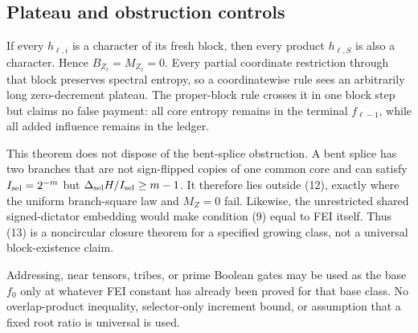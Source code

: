 \subsection*{Plateau and obstruction controls}

If every $h_{\ell,i}$ is a character of its fresh block, then every product
$h_{\ell,S}$ is also a character.  Hence $B_{Z_\ell}=M_{Z_\ell}=0$.
Every partial coordinate restriction through that block preserves spectral
entropy, so a coordinatewise rule sees an arbitrarily long zero-decrement
plateau.  The proper-block rule crosses it in one block step but claims no
false payment: all core entropy remains in the terminal $f_{\ell-1}$, while
all added influence remains in the ledger.

This theorem does not dispose of the bent-splice obstruction.  A bent splice
has two branches that are not sign-flipped copies of one common core and can
satisfy $I_{\rm sel}=2^{-m}$ but
$\Delta_{\rm sel}H/I_{\rm sel}\ge m-1$.  It therefore lies outside (12),
exactly where the uniform branch-square law and $M_Z=0$ fail.  Likewise, the
unrestricted shared signed-dictator embedding would make condition (9) equal
to FEI itself.  Thus (13) is a noncircular closure theorem for a specified
growing class, not a universal block-existence claim.

Addressing, near tensors, tribes, or prime Boolean gates may be used as the
base $f_0$ only at whatever FEI constant has already been proved for that
base class.  No overlap-product inequality, selector-only increment bound,
or assumption that a fixed root ratio is universal is used.
